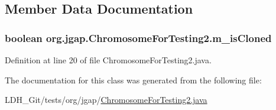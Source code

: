 \subsection{Member Data Documentation}
\hypertarget{classorg_1_1jgap_1_1_chromosome_for_testing2_a15641c41e53783cccc3adbd51caebce2}{
\subsubsection[{m\-\_\-is\-Cloned}]{\setlength{\rightskip}{0pt plus 5cm}boolean org.\-jgap.\-Chromosome\-For\-Testing2.\-m\-\_\-is\-Cloned\hspace{0.3cm}{\ttfamily [private]}}}\label{classorg_1_1jgap_1_1_chromosome_for_testing2_a15641c41e53783cccc3adbd51caebce2}


Definition at line 20 of file Chromosome\-For\-Testing2.\-java.



The documentation for this class was generated from the following file\-:\begin{DoxyCompactItemize}
\item 
L\-D\-H\-\_\-\-Git/tests/org/jgap/\hyperlink{_chromosome_for_testing2_8java}{Chromosome\-For\-Testing2.\-java}\end{DoxyCompactItemize}
